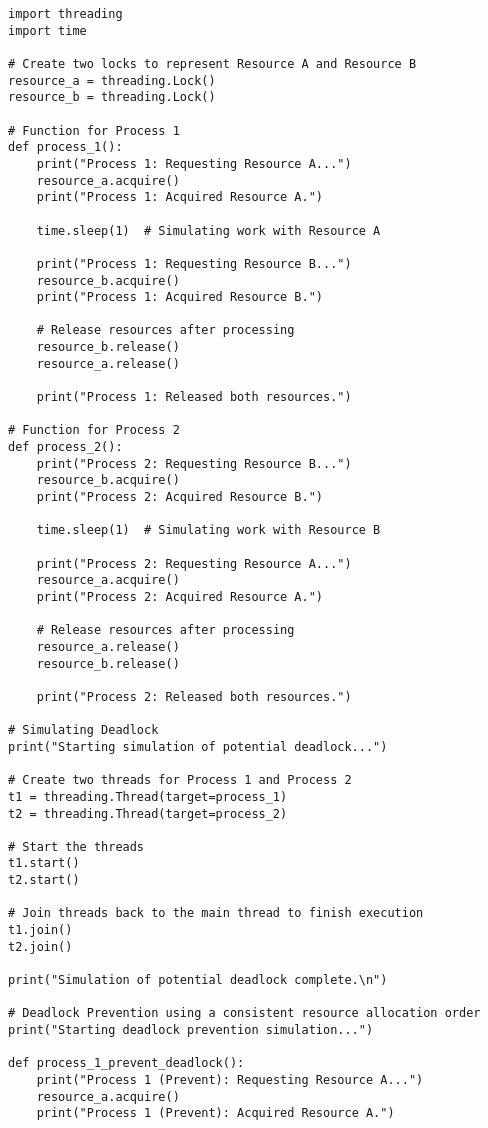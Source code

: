 \documentclass[12pt]{article}
\begin{document}
\begin{lstlisting}
import threading
import time

# Create two locks to represent Resource A and Resource B
resource_a = threading.Lock()
resource_b = threading.Lock()

# Function for Process 1
def process_1():
    print("Process 1: Requesting Resource A...")
    resource_a.acquire()
    print("Process 1: Acquired Resource A.")
    
    time.sleep(1)  # Simulating work with Resource A
    
    print("Process 1: Requesting Resource B...")
    resource_b.acquire()
    print("Process 1: Acquired Resource B.")
    
    # Release resources after processing
    resource_b.release()
    resource_a.release()
    
    print("Process 1: Released both resources.")

# Function for Process 2
def process_2():
    print("Process 2: Requesting Resource B...")
    resource_b.acquire()
    print("Process 2: Acquired Resource B.")
    
    time.sleep(1)  # Simulating work with Resource B
    
    print("Process 2: Requesting Resource A...")
    resource_a.acquire()
    print("Process 2: Acquired Resource A.")
    
    # Release resources after processing
    resource_a.release()
    resource_b.release()
    
    print("Process 2: Released both resources.")

# Simulating Deadlock
print("Starting simulation of potential deadlock...")

# Create two threads for Process 1 and Process 2
t1 = threading.Thread(target=process_1)
t2 = threading.Thread(target=process_2)

# Start the threads
t1.start()
t2.start()

# Join threads back to the main thread to finish execution
t1.join()
t2.join()

print("Simulation of potential deadlock complete.\n")

# Deadlock Prevention using a consistent resource allocation order
print("Starting deadlock prevention simulation...")

def process_1_prevent_deadlock():
    print("Process 1 (Prevent): Requesting Resource A...")
    resource_a.acquire()
    print("Process 1 (Prevent): Acquired Resource A.")
    

\end{lstlisting}
\end{document}

